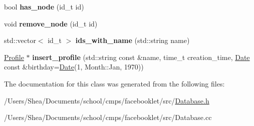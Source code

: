 \begin{DoxyCompactItemize}
\item 
\hypertarget{classfb_1_1_database_a92c3028d238865d57c94881431465e76}{bool {\bfseries has\+\_\+node} (id\+\_\+t id)}\label{classfb_1_1_database_a92c3028d238865d57c94881431465e76}

\item 
\hypertarget{classfb_1_1_database_ab2ccc687a520e876da67f6620b75308c}{void {\bfseries remove\+\_\+node} (id\+\_\+t id)}\label{classfb_1_1_database_ab2ccc687a520e876da67f6620b75308c}

\item 
\hypertarget{classfb_1_1_database_a94dc36e64c814292188de74e6da46024}{std\+::vector$<$ id\+\_\+t $>$ {\bfseries ids\+\_\+with\+\_\+name} (std\+::string name)}\label{classfb_1_1_database_a94dc36e64c814292188de74e6da46024}

\item 
\hypertarget{classfb_1_1_database_acd72daebc473b882f1a29a288aa13e69}{\hyperlink{classfb_1_1_profile}{Profile} $\ast$ {\bfseries insert\+\_\+profile} (std\+::string const \&name, time\+\_\+t creation\+\_\+time, \hyperlink{structfb_1_1_date}{Date} const \&birthday=\hyperlink{structfb_1_1_date}{Date}(1, Month\+::\+Jan, 1970))}\label{classfb_1_1_database_acd72daebc473b882f1a29a288aa13e69}

\end{DoxyCompactItemize}


The documentation for this class was generated from the following files\+:\begin{DoxyCompactItemize}
\item 
/\+Users/\+Shea/\+Documents/school/cmps/facebooklet/src/\hyperlink{_database_8h}{Database.\+h}\item 
/\+Users/\+Shea/\+Documents/school/cmps/facebooklet/src/Database.\+cc\end{DoxyCompactItemize}
